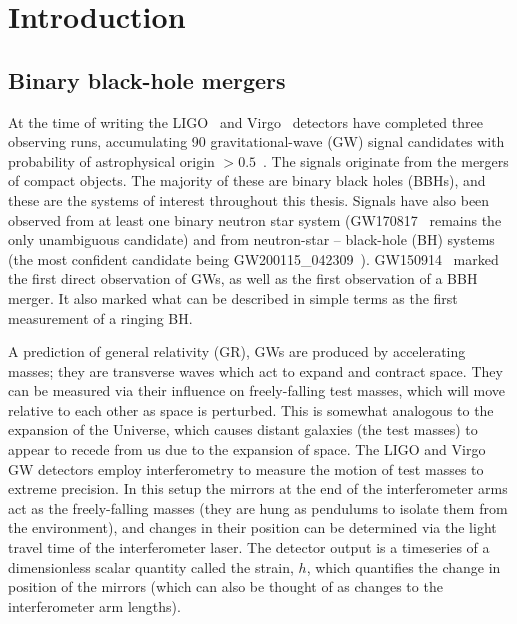 
\chapter{Introduction}

\label{Chapter1}

\section{Binary black-hole mergers}

At the time of writing the 
LIGO~\cite{LIGOScientific:2014pky} and Virgo~\cite{VIRGO:2014yos} detectors have completed three observing runs, accumulating 90 gravitational-wave (GW) signal candidates with probability of astrophysical origin $> 0.5$~\cite{LIGOScientific:2018mvr, LIGOScientific:2020ibl, LIGOScientific:2021usb, LIGOScientific:2021djp}.
The signals originate from the mergers of compact objects. 
The majority of these are binary black holes (BBHs), and these are the systems of interest throughout this thesis.  
Signals have also been observed from at least one binary neutron star system (GW170817~\cite{LIGOScientific:2017vwq} remains the only unambiguous candidate) and from neutron-star -- black-hole (BH) systems (the most confident candidate being GW200115\_042309~\cite{LIGOScientific:2021qlt}).
GW150914~\cite{LIGOScientific:2016aoc} marked the first direct observation of GWs, as well as the first observation of a BBH merger.
It also marked what can be described in simple terms as the first measurement of a ringing BH.

A prediction of general relativity (GR), GWs are produced by accelerating masses; they are transverse waves which act to expand and contract space.
They can be measured via their influence on freely-falling test masses, which will move relative to each other as space is perturbed.
This is somewhat analogous %
to the expansion of the Universe, which causes distant galaxies (the test masses) to appear to recede from us due to the expansion of space.
The LIGO and Virgo GW detectors employ interferometry to measure the motion of test masses to extreme precision.
In this setup the mirrors at the end of the interferometer arms act as the freely-falling masses (they are hung as pendulums to isolate them from the environment), and changes in their position can be determined via the light travel time of the interferometer laser.
The detector output is a timeseries of a dimensionless scalar quantity called the strain, $h$, which quantifies the change in position of the mirrors (which can also be thought of as changes to the interferometer arm lengths).

